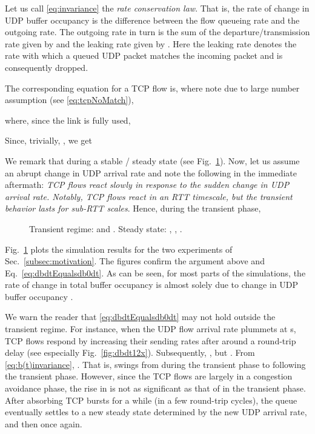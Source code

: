 \documentclass{IEEEtran}
\begin{document}
    Let us call \eqref{eq:invariance} the \emph{ rate conservation law}. That is, the rate of change in UDP buffer occupancy is the difference between the flow queueing rate  and the outgoing rate. The outgoing rate in turn is the sum of the departure/transmission rate given by  and the leaking rate given by . Here the leaking rate denotes the rate with which a queued UDP packet matches the incoming packet and is consequently dropped.

   The corresponding equation for a TCP flow is, where note  due to large number assumption (see \eqref{eq:tcpNoMatch}),
    
    where, since the link is fully used,
    

   Since, trivially, , we get
   

    We remark  that during a stable / steady state   (see Fig.~\ref{fig:dbdt}). 
    Now, let us assume  an abrupt change in UDP arrival rate  and note the following in the immediate aftermath:
\textit{ TCP flows react slowly in response to the sudden change in UDP arrival rate. Notably, TCP flows react in an RTT timescale, but the transient behavior lasts for sub-RTT scales}.
    Hence, during the transient phase,
    

    \begin{figure}[bht!]\centering
                  \hspace{5mm}
            \caption{Transient regime:  and . Steady state: , , .}
            \label{fig:dbdt}
    \end{figure}

    Fig.~\ref{fig:dbdt} plots the simulation results for the two experiments of Sec.~\ref{subsec:motivation}. The figures confirm the argument above and Eq.~\eqref{eq:dbdtEqualsdb0dt}. As can be seen, for most parts of the simulations, the rate of change in total buffer occupancy  is almost solely due to change in UDP buffer occupancy .

    We warn the reader that \eqref{eq:dbdtEqualsdb0dt} may not hold outside the transient regime. For instance, when the UDP flow arrival rate plummets at s, TCP flows respond by increasing their sending rates after around a round-trip delay (see especially Fig.~\ref{fig:dbdt12x}). Subsequently, , but . From \eqref{eq:b(t)invariance}, . That is,  swings from  during the transient phase to  following the transient phase. However, since the TCP flows are largely in a congestion avoidance phase, the rise in  is not as significant as that of  in the transient phase. After absorbing TCP bursts for a while (in a few round-trip cycles), the queue eventually settles to a new steady state determined by the new UDP arrival rate, and then  once again.
\end{document}
